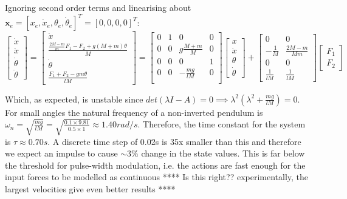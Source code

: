 \documentclass[main.tex]{subfiles}
\begin{document}
Ignoring second order terms and linearising about $\boldsymbol{x}_e = [x_e, \dot{x}_e, \theta_e, \dot{\theta}_e]^T = [0, 0, 0, 0]^T$:
\begin{equation}
\begin{bmatrix} \dot{x} \\ \ddot{x} \\ \dot{\theta} \\ \ddot{\theta} \end{bmatrix} 
=   \begin{bmatrix} 
    \dot{x} \\ 
    \frac{\frac{2M-m}{m}F_1-F_2 + g(M+m)\theta}{M} \\ 
    \dot{\theta} \\ 
    \frac{F_1 + F_2 - gm\theta}{lM} 
    \end{bmatrix}
=   \begin{bmatrix} 
    0 & 1 & 0 & 0 \\
    0 & 0 & g\frac{M+m}{M} & 0 \\
    0 & 0 & 0 & 1 \\
    0 & 0 & -\frac{mg}{lM} & 0 \\
    \end{bmatrix}
    \begin{bmatrix} x \\ \dot{x} \\ \theta \\ \dot{\theta} \end{bmatrix}
+  \begin{bmatrix} 0 & 0 \\ -\frac{1}{M} & \frac{2M-m}{Mm} \\ 0 & 0 \\ \frac{1}{lM} & \frac{1}{lM} \end{bmatrix} 
\begin{bmatrix} F_1 \\ F_2 \end{bmatrix}
\end{equation}

Which, as expected, is unstable since $det(\lambda I - A) = 0 \implies \lambda^2(\lambda^2 + \frac{mg}{lM}) = 0$. For small angles the natural frequency of a non-inverted pendulum is $\omega_n = \sqrt{\frac{mg}{lM}} = \sqrt{\frac{0.1\times 9.81}{0.5\times 1}} \approx 1.40 rad/s$. Therefore, the time constant for the system is $\tau \approx 0.70s$. A discrete time step of 0.02s is 35x smaller than this and therefore we expect an impulse to cause $\sim 3\%$ change in the state values. This is far below the threshold for pulse-width modulation, i.e. the actions are fast enough for the input forces to be modelled as continuous **** Is this right?? experimentally, the largest velocities give even better results ****
\end{document}

